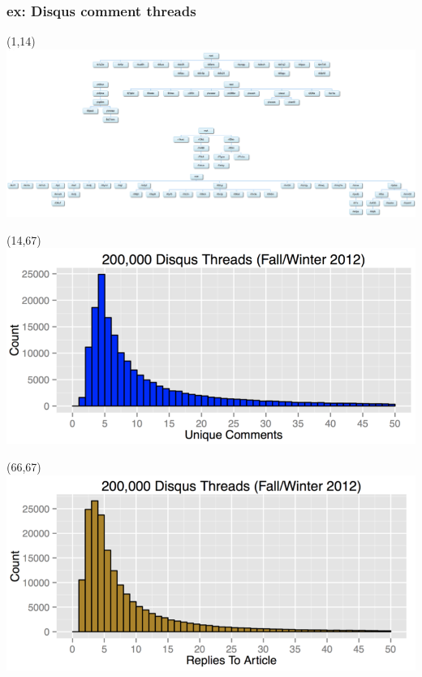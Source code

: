 \documentclass{beamer}
\begin{document}
%
\begin{frame} \frametitle{ex: Disqus comment threads}

\begin{textblock}{1}(1,14)
	\includegraphics[scale=0.155]{./imgs/disqus4.png}
\end{textblock}

\begin{textblock}{1}(14,67)
	\includegraphics[scale=0.165]{./imgs/disqus5.png}
\end{textblock}

\begin{textblock}{1}(66,67)
	\includegraphics[scale=0.17]{./imgs/disqus6.png}
\end{textblock}

\end{frame}
\end{document}
